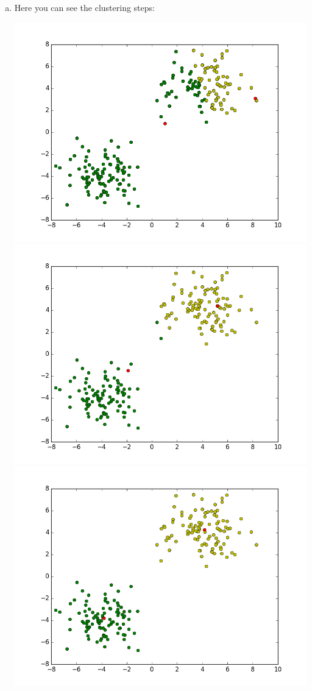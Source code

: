 \documentclass[12pt]{article}
\begin{document}
\begin{enumerate}[a)]
    \item 
        Here you can see the clustering steps:
        \begin{center}
            \includegraphics[scale = 0.52]{pictures/plot1}\\
            \includegraphics[scale = 0.52]{pictures/plot2}\\
            \includegraphics[scale = 0.52]{pictures/plot3}\\

\end{center}
\end{enumerate}
\end{document}
